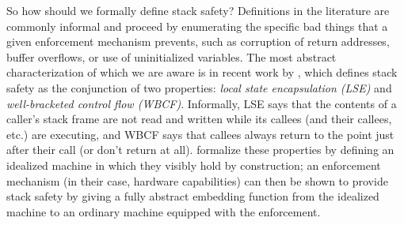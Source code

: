 \documentclass[acmsmall,review,anonymous]{acmart}\settopmatter{printfolios=true,printccs=false,printacmref=false}
\begin{document}
So how should we formally define stack safety? Definitions in the literature are commonly informal
and proceed by enumerating the specific bad things that a given enforcement mechanism
prevents, such as corruption of return addresses, buffer overflows, or
use of uninitialized variables.
The most abstract characterization of which we are aware is in
recent work by \citet{Skorstengaard+19}, which defines stack safety as the conjunction of two properties:
{\em local state encapsulation (LSE)} and {\em well-bracketed control flow (WBCF)}.
Informally, LSE says that the contents of
a caller's stack frame are not read and written while its callees (and their callees, etc.) are
executing, and WBCF says that callees always
return to the point just after their call (or don't return at all).
\citet{Skorstengaard+19} formalize these properties by defining an idealized machine
in which they visibly hold by construction; an enforcement mechanism (in their case, hardware capabilities)
can then be shown to provide stack safety by giving a fully abstract embedding function
from the idealized machine to an ordinary machine equipped with the enforcement.
\end{document}
